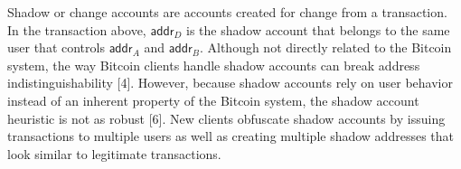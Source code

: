 Shadow or change accounts are accounts created for change from a transaction. In the transaction above, $\mathsf{addr}_D$ is the shadow account that belongs to the same user that controls $\mathsf{addr}_A$ and $\mathsf{addr}_B$. Although not directly related to the Bitcoin system, the way Bitcoin clients handle shadow accounts can break address indistinguishability [4]. However, because shadow accounts rely on user behavior instead of an inherent property of the Bitcoin system, the shadow account heuristic is not as robust [6]. New clients obfuscate shadow accounts by issuing transactions to multiple users as well as creating multiple shadow addresses that look similar to legitimate transactions.
